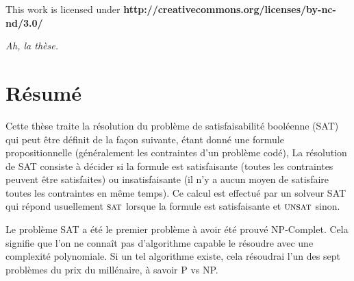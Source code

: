 \clearpage\null\vfill
\thispagestyle{empty}
\begin{minipage}[b]{.9\textwidth}
  \begin{center}
  \setlength{\parskip}{.5\baselineskip}
  {\color{phdcol0}%
   \ccLogo\hspace{.1cm}%
   \ccAttribution\hspace{.1cm}%
   \ccNonCommercial\hspace{.1cm}%
   \ccNoDerivatives}\hspace{.15cm}%
  \footnotesize%
  This work is licensed under {\color{phdcol1}\textbf{http://creativecommons.org/licenses/by-nc-nd/3.0/}}
  \end{center}
\end{minipage}
\vspace*{2\baselineskip}

\clearpage

\thispagestyle{empty}
\begin{flushright}
  \textit{Ah, la thèse.}
\end{flushright}
%
%
%

%
\chapter*{Résumé}

Cette thèse traite la résolution du problème de satisfaisabilité booléenne (SAT)
qui peut être définit de la façon suivante,
étant donné une formule propositionnelle (généralement les contraintes d'un problème codé),
La résolution de SAT consiste à décider si la formule est satisfaisante (toutes les contraintes peuvent être satisfaites) ou insatisfaisante (il n'y a aucun moyen de satisfaire toutes les contraintes en même
temps). Ce calcul est effectué par un solveur SAT qui répond usuellement $\textsc{sat}$ lorsque la formule est satisfaisante et $\textsc{unsat}$ sinon.
 
Le problème SAT a été le premier problème à avoir été prouvé NP-Complet. Cela signifie que
l'on ne connaît pas d'algorithme capable le résoudre avec une complexité polynomiale.
Si un tel algorithme existe, cela résoudrai l'un des sept problèmes du prix du millénaire, à savoir 
P vs NP.

